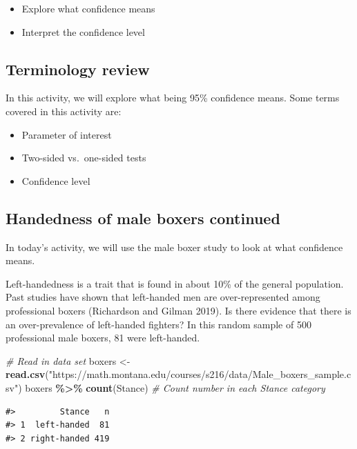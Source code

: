 \documentclass[
]{report}
\newenvironment{Shaded}{\begin{snugshade}}{\end{snugshade}}
\newcommand{\CommentTok}[1]{\textcolor[rgb]{0.56,0.35,0.01}{\textit{#1}}}
\newcommand{\FunctionTok}[1]{\textcolor[rgb]{0.13,0.29,0.53}{\textbf{#1}}}
\newcommand{\NormalTok}[1]{#1}
\newcommand{\OtherTok}[1]{\textcolor[rgb]{0.56,0.35,0.01}{#1}}
\newcommand{\SpecialCharTok}[1]{\textcolor[rgb]{0.81,0.36,0.00}{\textbf{#1}}}
\newcommand{\StringTok}[1]{\textcolor[rgb]{0.31,0.60,0.02}{#1}}
\begin{document}
\begin{itemize}
\item
  Explore what confidence means
\item
  Interpret the confidence level
\end{itemize}

\subsection{Terminology review}\label{terminology-review-6}

In this activity, we will explore what being 95\% confidence means. Some terms covered in this activity are:

\begin{itemize}
\item
  Parameter of interest
\item
  Two-sided vs.~one-sided tests
\item
  Confidence level
\end{itemize}

\subsection{Handedness of male boxers continued}\label{handedness-of-male-boxers-continued}

In today's activity, we will use the male boxer study to look at what confidence means.

Left-handedness is a trait that is found in about 10\% of the general population. Past studies have shown that left-handed men are over-represented among professional boxers (Richardson and Gilman 2019). Is there evidence that there is an over-prevalence of left-handed fighters? In this random sample of 500 professional male boxers, 81 were left-handed.

\begin{Shaded}
\begin{Highlighting}[]
 \CommentTok{\# Read in data set}
\NormalTok{boxers }\OtherTok{\textless{}{-}} \FunctionTok{read.csv}\NormalTok{(}\StringTok{"https://math.montana.edu/courses/s216/data/Male\_boxers\_sample.csv"}\NormalTok{)}
\NormalTok{boxers }\SpecialCharTok{\%\textgreater{}\%} \FunctionTok{count}\NormalTok{(Stance)  }\CommentTok{\# Count number in each Stance category}
\end{Highlighting}
\end{Shaded}

\begin{verbatim}
#>         Stance   n
#> 1  left-handed  81
#> 2 right-handed 419
\end{verbatim}
\end{document}
